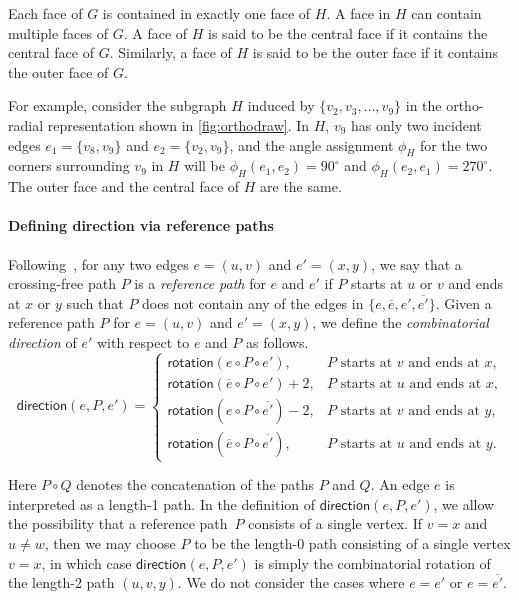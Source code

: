 \documentclass{article}\usepackage[a4paper,margin=20mm]{geometry}
\newcommand{\rotation}{\mathsf{rotation}}
\newcommand{\direction}{\mathsf{direction}}
\begin{document}
Each face of $G$ is contained in exactly one face of $H$. A face in $H$ can contain multiple faces of $G$. A face of $H$ is said to be the central face if it contains the central face of $G$. Similarly, a face of $H$ is said to be the outer face if it contains the outer face of $G$. 

For example, consider the subgraph $H$ induced by $\{v_2, v_3, \ldots, v_9\}$ in the ortho-radial representation shown in \cref{fig:orthodraw}. In $H$, $v_9$ has only two incident edges $e_1 = \{v_8, v_9\}$ and $e_2 = \{v_2, v_9\}$, and the angle assignment $\phi_H$ for the two corners surrounding $v_9$ in $H$ will be   $\phi_H(e_1, e_2) = 90^\circ$ and $\phi_H(e_2, e_1) = 270^\circ$. The outer face and the central face of $H$ are the same.


\paragraph{Defining direction via reference paths}
 Following~\cite{barth2023topology}, for any two edges $e=(u,v)$ and $e'=(x,y)$, we say that a crossing-free path $P$ is a \emph{reference path} for $e$ and $e'$ if $P$ starts at $u$ or $v$ and ends at $x$ or $y$ such that $P$ does not contain any of the edges in $\{e, \overline{e}, e', \overline{e'}\}$. Given  a reference path $P$ for  $e=(u,v)$ and $e'=(x,y)$, we define the \emph{combinatorial direction} of $e'$ with respect to $e$ and $P$ as follows.   
\[
\direction(e, P, e')=\begin{cases}
\rotation(e \circ P \circ e'), & \text{$P$ starts at $v$ and ends at $x$,}\\
\rotation(\overline{e} \circ P \circ e')+2, & \text{$P$ starts at $u$ and ends at $x$,}\\
\rotation(e \circ P \circ \overline{e'})-2, & \text{$P$ starts at $v$ and ends at $y$,}\\
\rotation(\overline{e} \circ P \circ \overline{e'}), & \text{$P$ starts at $u$ and ends at $y$.}
		 \end{cases}
\]

Here $P \circ Q$ denotes the concatenation of the paths $P$ and $Q$. An edge $e$ is interpreted as a length-1 path. In the definition of $\direction(e, P, e')$, we allow the possibility that a reference path~$P$ consists of a single vertex. If $v=x$ and $u \neq w$, then we may choose $P$ to be the length-0 path consisting of a single vertex $v=x$, in which case $\direction(e, P, e')$ is simply the combinatorial rotation of the length-2 path $(u,v,y)$.
We do not consider the cases where $e = e'$ or $e = \overline{e'}$. 
\end{document}
